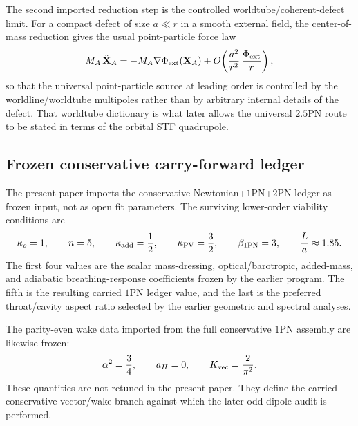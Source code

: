 \documentclass[11pt]{article}
\begin{document}
The second imported reduction step is the controlled worldtube/coherent-defect limit.
For a compact defect of size $a\ll r$ in a smooth external field, the center-of-mass
reduction gives the usual point-particle force law
\[
M_A\,\ddot{\mathbf X}_A
=
-M_A\nabla\Phi_{\rm ext}(\mathbf X_A)
+O\!\left(\frac{a^2}{r^2}\,\frac{\Phi_{\rm ext}}{r}\right),
\]
so that the universal point-particle source at leading order is controlled by the
worldline/worldtube multipoles rather than by arbitrary internal details of the defect.
That worldtube dictionary is what later allows the universal $2.5$PN route to be stated
in terms of the orbital STF quadrupole.

\subsection{Frozen conservative carry-forward ledger}
\label{sec:dictionary-target-frozen}

The present paper imports the conservative Newtonian+$1$PN+$2$PN ledger as frozen input,
not as open fit parameters.  The surviving lower-order viability conditions are
\[
\kappa_\rho = 1,
\qquad
n = 5,
\qquad
\kappa_{\rm add}=\frac12,
\qquad
\kappa_{\rm PV}=\frac32,
\qquad
\beta_{\rm 1PN}=3,
\qquad
\frac{L}{a}\approx 1.85.
\]
The first four values are the scalar mass-dressing, optical/barotropic, added-mass,
and adiabatic breathing-response coefficients frozen by the earlier program.  The fifth
is the resulting carried $1$PN ledger value, and the last is the preferred throat/cavity
aspect ratio selected by the earlier geometric and spectral analyses.

The parity-even wake data imported from the full conservative $1$PN assembly are likewise
frozen:
\[
\alpha^2=\frac34,
\qquad
a_H=0,
\qquad
K_{\rm vec}=\frac{2}{\pi^2}.
\]
These quantities are not retuned in the present paper.  They define the carried
conservative vector/wake branch against which the later odd dipole audit is performed.
\end{document}
